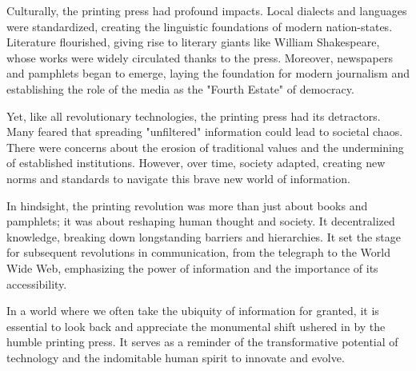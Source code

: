 Culturally, the printing press had profound impacts. Local dialects and languages were standardized, creating the linguistic foundations of modern nation-states. Literature flourished, giving rise to literary giants like William Shakespeare, whose works were widely circulated thanks to the press. Moreover, newspapers and pamphlets began to emerge, laying the foundation for modern journalism and establishing the role of the media as the "Fourth Estate" of democracy.

Yet, like all revolutionary technologies, the printing press had its detractors. Many feared that spreading "unfiltered" information could lead to societal chaos. There were concerns about the erosion of traditional values and the undermining of established institutions. However, over time, society adapted, creating new norms and standards to navigate this brave new world of information.

In hindsight, the printing revolution was more than just about books and pamphlets; it was about reshaping human thought and society. It decentralized knowledge, breaking down longstanding barriers and hierarchies. It set the stage for subsequent revolutions in communication, from the telegraph to the World Wide Web, emphasizing the power of information and the importance of its accessibility.

In a world where we often take the ubiquity of information for granted, it is essential to look back and appreciate the monumental shift ushered in by the humble printing press. It serves as a reminder of the transformative potential of technology and the indomitable human spirit to innovate and evolve.
